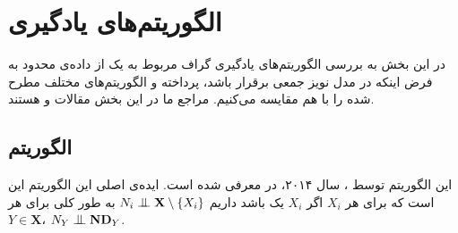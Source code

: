 \documentclass[a4paper,12pt]{article}
\newcommand{\bigCI}{\mathrel{\text{\scalebox{1.07}{$\perp\mkern-10mu\perp$}}}}
\begin{document}
\subsection{}
\section{الگوریتم‌های یادگیری}

در این بخش به بررسی الگوریتم‌های یادگیری گراف مربوط به یک 
از داده‌ی محدود به فرض اینکه  در
مدل نویز جمعی برقرار باشد، پرداخته و الگوریتم‌های مختلف مطرح شده را با هم مقایسه می‌کنیم. مراجع ما در این بخش مقالات 
\cite{continous}
و 
\cite{nowzohour}
هستند.
\subsection{الگوریتم 
}
این الگوریتم توسط 
،
سال ۲۰۱۴، در
\cite{continous}
معرفی شده است. ایده‌ی اصلی این الگوریتم این است که برای هر $X_i$ اگر $X_i$ یک
باشد داریم
$N_i \bigCI \mathbf{X} \setminus \{X_i\}$
به طور کلی برای هر 
$Y \in \mathbf{X}$،
$N_Y \bigCI \mathbf{ND}_Y$.
\end{document}
